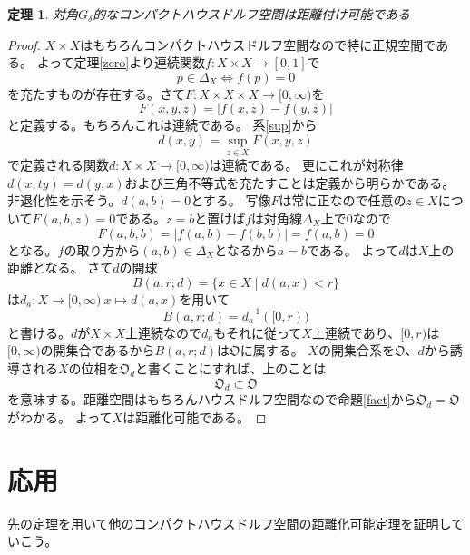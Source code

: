 \documentclass[leqno]{jsarticle}
\newtheorem{thm}{定理}
\begin{document}
\begin{thm}
対角$G_{\delta}$的なコンパクトハウスドルフ空間は距離付け可能である
\end{thm}
\begin{proof}
$X\times X$はもちろんコンパクトハウスドルフ空間なので特に正規空間である。
よって定理\ref{zero}より連続関数$f:X\times X\to [0,1]$で
\[
p\in \Delta_X\iff f(p)=0
\]
を充たすものが存在する。さて$F:X\times X\times X\to [0,\infty)$を
\[
F(x,y,z)=|f(x,z)-f(y,z)|
\]
と定義する。もちろんこれは連続である。
系\ref{sup}から
\[
d(x,y)=\sup_{z\in X}F(x,y,z)
\]
で定義される関数$d:X\times X\to [0,\infty)$は連続である。
更にこれが対称律$d(x,ty)=d(y,x)$および三角不等式を充たすことは定義から明らかである。
非退化性を示そう。$d(a,b)=0$とする。
写像$F$は常に正なので任意の$z\in X$について$F(a,b,z)=0$である。$z=b$と置けば$f$は対角線$\Delta_X$上で$0$なので
\[
F(a,b,b)=|f(a,b)-f(b,b)|=f(a,b)=0
\]
となる。$f$の取り方から$(a,b)\in \Delta_X$となるから$a=b$である。
よって$d$は$X$上の距離となる。
さて$d$の開球
\[
B(a,r;d)=\{x\in X\mid d(a,x)<r\}
\]
は$d_a:X\to [0,\infty)\ x\mapsto d(a,x)$を用いて
\[
B(a,r;d)=d_a^{-1}([0,r))
\]
と書ける。$d$が$X\times X$上連続なので$d_a$もそれに従って$X$上連続であり、$[0,r)$は$[0,\infty)$の開集合であるから$B(a,r;d)$は$\mathfrak{O}$に属する。
$X$の開集合系を$\mathfrak{O}$、$d$から誘導される$X$の位相を$\mathfrak{O}_d$と書くことにすれば、上のことは
\[
\mathfrak{O}_d\subset \mathfrak{O}
\]
を意味する。距離空間はもちろんハウスドルフ空間なので命題\ref{fact}から$\mathfrak{O}_d=\mathfrak{O}$がわかる。
よって$X$は距離化可能である。
	\end{proof}
\section{応用}
先の定理を用いて他のコンパクトハウスドルフ空間の距離化可能定理を証明していこう。
\end{document}
